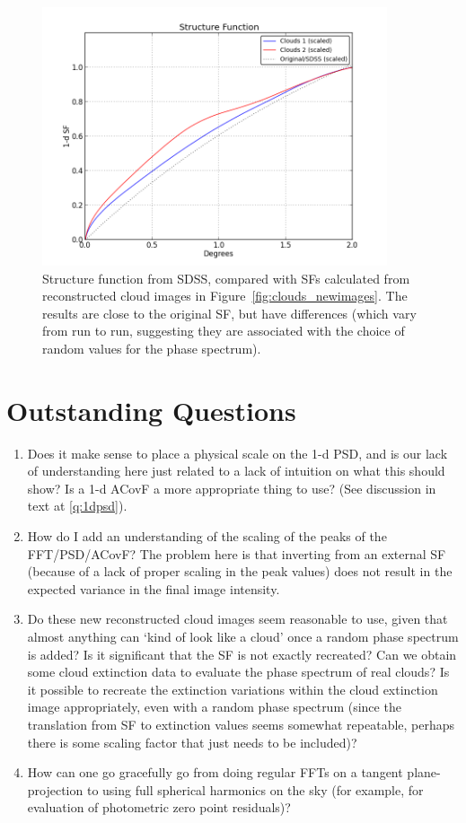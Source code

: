 \documentclass[11pt,preprint]{aastex}
\begin{document}
\begin{figure}[htpb]
\centering
\includegraphics[width=4in]{clouds_sf_new}
\caption{{\small
Structure function from SDSS, compared with SFs calculated from reconstructed cloud images in Figure~\ref{fig:clouds_newimages}. The results are close to the original SF, but have differences (which vary from run to run, suggesting they are associated with the choice of random values for the phase spectrum).}}
\label{fig:clouds_sf_new}
\end{figure}


\section{Outstanding Questions}
\begin{enumerate}
\item{Does it make sense to place a physical scale on the 1-d PSD, and is our lack of understanding here just related to a lack of intuition on what this should show? Is a 1-d ACovF a more appropriate thing to use? (See discussion in text at \ref{q:1dpsd}).}
\item{How do I add an understanding of the scaling of the peaks of the FFT/PSD/ACovF? The problem here is that inverting from an external SF (because of a lack of proper scaling in the peak values) does not result in the expected variance in the final image intensity. }
\item{Do these new reconstructed cloud images seem reasonable to use, given that almost anything can `kind of look like a cloud' once a random phase spectrum is added? Is it significant that the SF is not exactly recreated? Can we obtain some cloud extinction data to evaluate the phase spectrum of real clouds? Is it possible to recreate the extinction variations within the cloud extinction image appropriately, even with a random phase spectrum (since the translation from SF to extinction values seems somewhat repeatable, perhaps there is some scaling factor that just needs to be included)?}
\item{How can one go gracefully go from doing regular FFTs on a tangent plane-projection to using full spherical harmonics on the sky (for example, for evaluation of photometric zero point residuals)?}
\end{enumerate}
\end{document}
